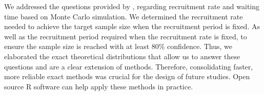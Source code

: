 We addressed the questions provided by \cite{carter2004application}, regarding recruitment rate and waiting time based on Monte Carlo simulation. We determined the recruitment rate needed to achieve the target sample size when the recruitment period is fixed. As well as the recruitment period required when the recruitment rate is fixed, to ensure the sample size is reached with at least 80\% confidence. Thus, we elaborated the exact theoretical distributions that allow us to answer these questions and are a clear extension of \cite{carter2004application} methods. Therefore, consolidating faster, more reliable exact methods was crucial for the design of future studies. Open source R software can help apply these methods in practice.
% 
